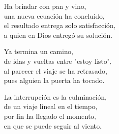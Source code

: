 \begin{center}
\vspace{1em} 
Ha brindar con pan y vino,\\ 
una nueva ecuación ha concluido,\\ 
el resultado entrega solo satisfacción,\\ 
a quien en Dios entregó su solución.

\vspace{1em} 
Ya termina un camino,\\ 
de idas y vueltas entre "estoy listo",\\ 
al parecer el viaje se ha retrasado,\\ 
pues alguien la puerta ha tocado.

\vspace{1em} 
La interrupción es la culminación,\\ 
de un viaje lineal en el tiempo,\\ 
por fin ha llegado el momento,\\ 
en que se puede seguir al viento.


\end{center}




